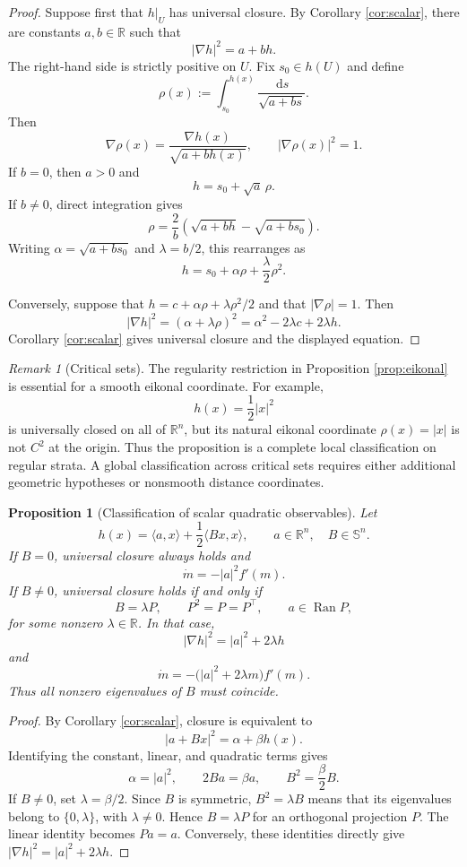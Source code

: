 \documentclass[11pt]{article}
\newcommand{\R}{\mathbb R}
\newcommand{\Sym}{\mathbb S}
\newcommand{\dd}{\,\mathrm d}
\newcommand{\Ran}{\operatorname{Ran}}
\newtheorem{proposition}{Proposition}
\theoremstyle{remark}
\newtheorem{remark}{Remark}
\begin{document}
\begin{proof}
Suppose first that \(h|_U\) has universal closure.  By Corollary
\ref{cor:scalar}, there are constants \(a,b\in\R\) such that
\[
  |\nabla h|^2=a+bh.
\]
The right-hand side is strictly positive on \(U\).  Fix \(s_0\in h(U)\)
and define
\[
  \rho(x)
  :=
  \int_{s_0}^{h(x)}
  \frac{\dd s}{\sqrt{a+bs}}.
\]
Then
\[
  \nabla\rho(x)
  =
  \frac{\nabla h(x)}{\sqrt{a+bh(x)}},
  \qquad
  |\nabla\rho(x)|^2=1.
\]
If \(b=0\), then \(a>0\) and
\[
  h=s_0+\sqrt a\,\rho.
\]
If \(b\neq0\), direct integration gives
\[
  \rho
  =
  \frac{2}{b}
  \left(
    \sqrt{a+bh}-\sqrt{a+bs_0}
  \right).
\]
Writing \(\alpha=\sqrt{a+bs_0}\) and \(\lambda=b/2\), this rearranges as
\[
  h=s_0+\alpha\rho+\frac{\lambda}{2}\rho^2.
\]

Conversely, suppose that \(h=c+\alpha\rho+\lambda\rho^2/2\) and that
\(|\nabla\rho|=1\).  Then
\[
  |\nabla h|^2
  =
  (\alpha+\lambda\rho)^2
  =
  \alpha^2-2\lambda c+2\lambda h.
\]
Corollary \ref{cor:scalar} gives universal closure and the displayed
equation.
\end{proof}

\begin{remark}[Critical sets]
The regularity restriction in Proposition \ref{prop:eikonal} is essential
for a smooth eikonal coordinate.  For example,
\[
  h(x)=\frac12|x|^2
\]
is universally closed on all of \(\R^n\), but its natural eikonal coordinate
\(\rho(x)=|x|\) is not \(C^2\) at the origin.  Thus the proposition is a
complete local classification on regular strata.  A global classification
across critical sets requires either additional geometric hypotheses or
nonsmooth distance coordinates.
\end{remark}

\begin{proposition}[Classification of scalar quadratic observables]
\label{prop:scalar-quadratic}
Let
\[
  h(x)
  =
  \langle a,x\rangle+\frac12\langle Bx,x\rangle,
  \qquad
  a\in\R^n,\quad B\in\Sym^n.
\]
If \(B=0\), universal closure always holds and
\[
  \dot m=-|a|^2f'(m).
\]
If \(B\neq0\), universal closure holds if and only if
\[
  B=\lambda P,
  \qquad
  P^2=P=P^\top,
  \qquad
  a\in\Ran P,
\]
for some nonzero \(\lambda\in\R\).  In that case,
\[
  |\nabla h|^2=|a|^2+2\lambda h
\]
and
\[
  \dot m
  =
  -\bigl(|a|^2+2\lambda m\bigr)f'(m).
\]
Thus all nonzero eigenvalues of \(B\) must coincide.
\end{proposition}

\begin{proof}
By Corollary \ref{cor:scalar}, closure is equivalent to
\[
  |a+Bx|^2=\alpha+\beta h(x).
\]
Identifying the constant, linear, and quadratic terms gives
\[
  \alpha=|a|^2,
  \qquad
  2Ba=\beta a,
  \qquad
  B^2=\frac{\beta}{2}B.
\]
If \(B\neq0\), set \(\lambda=\beta/2\).  Since \(B\) is symmetric,
\(B^2=\lambda B\) means that its eigenvalues belong to
\(\{0,\lambda\}\), with \(\lambda\neq0\).  Hence \(B=\lambda P\) for an
orthogonal projection \(P\).  The linear identity becomes \(Pa=a\).
Conversely, these identities directly give
\(|\nabla h|^2=|a|^2+2\lambda h\).
\end{proof}
\end{document}
